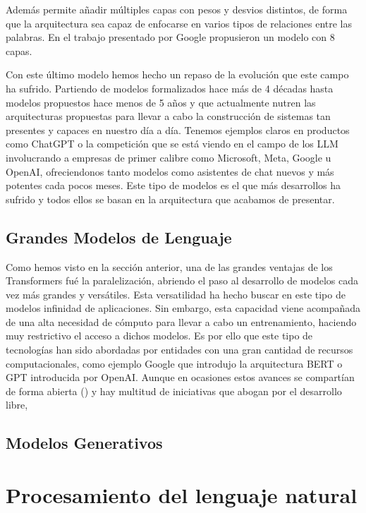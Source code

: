 \begin{itemize}
Además permite añadir múltiples capas con pesos y desvios distintos, de forma que la arquitectura sea capaz de enfocarse en varios tipos de relaciones entre las palabras. En el trabajo presentado por Google propusieron un modelo con 8 capas.

\end{itemize}

Con este último modelo hemos hecho un repaso de la evolución que este campo ha sufrido. Partiendo de modelos formalizados hace más de 4 décadas hasta modelos propuestos hace menos de 5 años y que actualmente nutren las arquitecturas propuestas para llevar a cabo la construcción de sistemas tan presentes y capaces en nuestro día a día. Tenemos ejemplos claros en productos como ChatGPT o la competición que se está viendo en el campo de los LLM involucrando a empresas de primer calibre como Microsoft, Meta, Google u OpenAI, ofreciendonos tanto modelos como asistentes de chat nuevos y más potentes cada pocos meses. Este tipo de modelos es el que más desarrollos ha sufrido y todos ellos se basan en la arquitectura que acabamos de presentar.

\subsection{Grandes Modelos de Lenguaje}

Como hemos visto en la sección anterior, una de las grandes ventajas de los Transformers fué la paralelización, abriendo el paso al desarrollo de modelos cada vez más grandes y versátiles. Esta versatilidad ha hecho buscar en este tipo de modelos infinidad de aplicaciones. Sin embargo, esta capacidad viene acompañada de una alta necesidad de cómputo para llevar a cabo un entrenamiento, haciendo muy restrictivo el acceso a dichos modelos. Es por ello que este tipo de tecnologías han sido abordadas por entidades con una gran cantidad de recursos computacionales, como ejemplo Google que introdujo la arquitectura BERT o GPT introducida por OpenAI. Aunque  en ocasiones estos avances se compartían de forma abierta (\cite{touvron2023llama}) y hay multitud de iniciativas que abogan por el desarrollo libre, 

\subsection{Modelos Generativos}

\section{Procesamiento del lenguaje natural}

